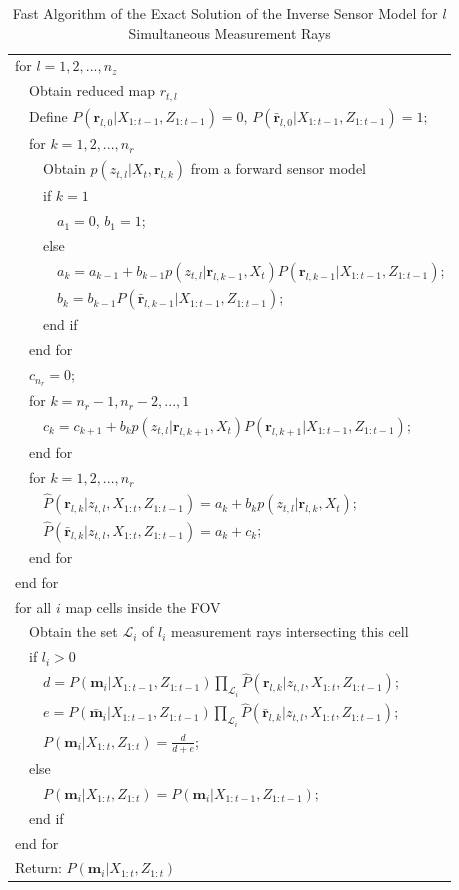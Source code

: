 \documentclass[letterpaper, 10pt, conference]{ieeeconf}
\begin{document}
\begin{table}
\begin{tabular}{ l }
  for $l = 1,2,...,n_z$\\
   \ \ Obtain reduced map $r_{t,l}$\\
   \ \ Define $P(\mathbf{r}_{l,0}|X_{1:t-1},Z_{1:t-1})=0$, $P(\bar{\mathbf{r}}_{l,0}|X_{1:t-1},Z_{1:t-1})=1$;\\
   \ \ for $k = 1,2,...,n_r$\\
   \ \ \ \ Obtain $p(z_{t,l}|X_t,\mathbf{r}_{l,k})$ from a forward sensor model\\
   \ \ \ \ if $k=1$\\
   \ \ \ \ \ \ $a_1=0$, $b_1=1$;\\
   \ \ \ \ else\\
   \ \ \ \ \ \ $a_k=a_{k-1}+b_{k-1}p(z_{t,l}|\mathbf{r}_{l,k-1},X_t)P(\mathbf{r}_{l,k-1}|X_{1:t-1},Z_{1:t-1})$;\\
   \ \ \ \ \ \ $b_k=b_{k-1}P(\bar{\mathbf{r}}_{l,k-1}|X_{1:t-1},Z_{1:t-1})$;\\
   \ \ \ \ end if\\
   \ \ end for\\
   \ \ $c_{n_r}=0$;\\
   \ \ for $k = n_r-1,n_r-2,...,1$\\
   \ \ \ \ $c_k=c_{k+1}+b_{k}p(z_{t,l}|\mathbf{r}_{l,k+1},X_t)P(\mathbf{r}_{l,k+1}|X_{1:t-1},Z_{1:t-1})$;\\
   \ \ end for\\
   \ \ for $k = 1,2,...,n_r$\\
   \ \ \ \ $\hat P(\mathbf{r}_{l,k}|z_{t,l},X_{1:t},Z_{1:t-1})=a_k+b_kp(z_{t,l}|\mathbf{r}_{l,k},X_t)$;\\
   \ \ \ \ $\hat P(\bar{\mathbf{r}}_{l,k}|z_{t,l},X_{1:t},Z_{1:t-1})=a_k+c_k$;\\
   \ \ end for\\
   end for\\
   for all $i$ map cells inside the FOV\\
   \ \ Obtain the set $\mathcal L_i$ of $l_i$ measurement rays intersecting this cell\\
   \ \ if $l_i>0$\\
   \ \ \ \ $d=P(\mathbf{m}_i|X_{1:t-1},Z_{1:t-1})\prod_{\mathcal L_i}\hat P(\mathbf{r}_{l,k}|z_{t,l},X_{1:t},Z_{1:t-1})$;\\
   \ \ \ \ $e=P(\bar{\mathbf{m}}_i|X_{1:t-1},Z_{1:t-1})\prod_{\mathcal L_i}\hat P(\bar{\mathbf{r}}_{l,k}|z_{t,l},X_{1:t},Z_{1:t-1})$;\\
   \ \ \ \ $P(\mathbf{m}_i|X_{1:t},Z_{1:t})=\frac{d}{d+e}$;\\
   \ \ else\\
   \ \ \ \ $P(\mathbf{m}_i|X_{1:t},Z_{1:t})=P(\mathbf{m}_i|X_{1:t-1},Z_{1:t-1});$\\
   \ \ end if\\
   end for\\
Return: $P(\mathbf{m}_i|X_{1:t},Z_{1:t})$\\
\end{tabular}
\caption{Fast Algorithm of the Exact Solution of the Inverse Sensor Model for $l$ Simultaneous Measurement Rays}
\label{tab:Alg_ISM_2D}
\end{table}
\end{document}

